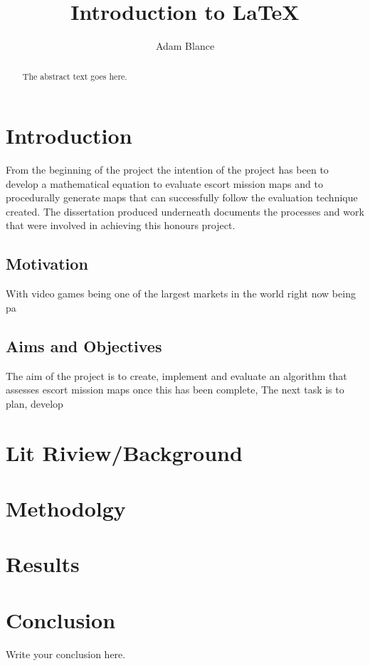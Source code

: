 \documentclass{article}
\begin{document}
\title{Introduction to \LaTeX{}}
\author{Adam Blance}

\maketitle

\begin{abstract}
The abstract text goes here.
\end{abstract}

\section{Introduction}
From the beginning of the project the intention of the project has been to develop a mathematical equation to evaluate escort mission maps and to procedurally generate maps that can successfully follow the evaluation technique created. The dissertation produced underneath documents the processes and work that were involved in achieving this honours project.
\subsection{Motivation}
With video games being one of the largest markets in the world right now being pa

\subsection{Aims and Objectives}
The aim of the project is to create, implement and evaluate an algorithm that assesses escort mission maps once this has been complete, The next task is to plan, develop 

\section{Lit Riview/Background}

\section{Methodolgy}

\section{Results}

\section{Conclusion}
Write your conclusion here.
\end{document}
